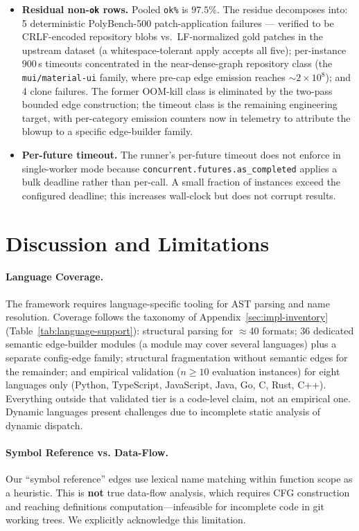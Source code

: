\documentclass[11pt, a4paper]{article}
\begin{document}
\begin{itemize}
    \item \textbf{Residual non-\texttt{ok} rows.} Pooled \texttt{ok\%} is $97.5\%$. The residue decomposes into: 5 deterministic PolyBench-500 patch-application failures --- verified to be CRLF-encoded repository blobs vs.\ LF-normalized gold patches in the upstream dataset (a whitespace-tolerant apply accepts all five); per-instance $900$\,s timeouts concentrated in the near-dense-graph repository class (the \texttt{mui/material-ui} family, where pre-cap edge emission reaches ${\sim}2\times10^8$); and 4 clone failures. The former OOM-kill class is eliminated by the two-pass bounded edge construction; the timeout class is the remaining engineering target, with per-category emission counters now in telemetry to attribute the blowup to a specific edge-builder family.
    \item \textbf{Per-future timeout.} The runner's per-future timeout does not enforce in single-worker mode because \texttt{concurrent.futures.as\_completed} applies a bulk deadline rather than per-call. A small fraction of instances exceed the configured deadline; this increases wall-clock but does not corrupt results.
\end{itemize}

\newpage
\section{Discussion and Limitations}

\paragraph{Language Coverage.}
The framework requires language-specific tooling for AST parsing and name resolution. Coverage follows the taxonomy of Appendix~\ref{sec:impl-inventory} (Table~\ref{tab:language-support}): structural parsing for $\approx$40 formats; 36 dedicated semantic edge-builder modules (a module may cover several languages) plus a separate config-edge family; structural fragmentation without semantic edges for the remainder; and empirical validation ($n \geq 10$ evaluation instances) for eight languages only (Python, TypeScript, JavaScript, Java, Go, C, Rust, C++). Everything outside that validated tier is a code-level claim, not an empirical one. Dynamic languages present challenges due to incomplete static analysis of dynamic dispatch.

\paragraph{Symbol Reference vs. Data-Flow.}
Our ``symbol reference'' edges use lexical name matching within function scope as a heuristic. This is \textbf{not} true data-flow analysis, which requires CFG construction and reaching definitions computation---infeasible for incomplete code in git working trees. We explicitly acknowledge this limitation.
\end{document}
